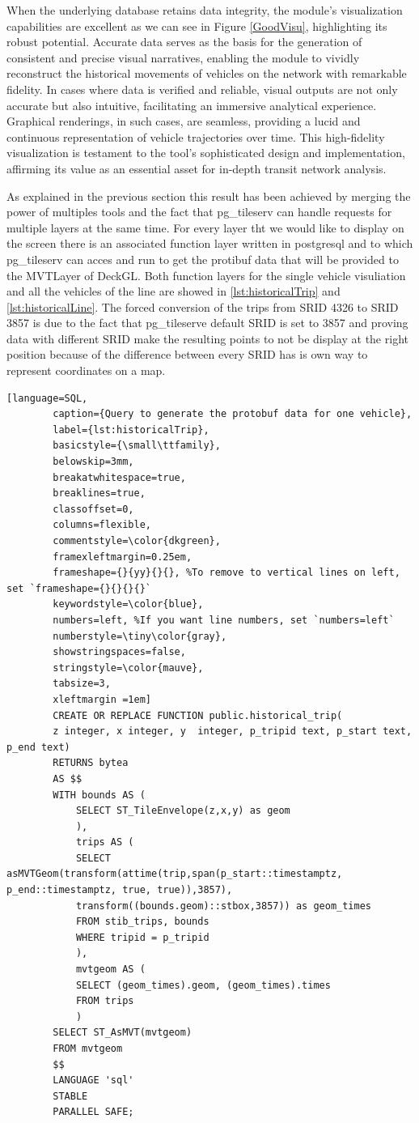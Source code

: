 \documentclass[12pt]{report}
\begin{document}
	When the underlying database retains data integrity, the module's visualization capabilities are excellent as  we can see in Figure \ref{GoodVisu}, highlighting its robust potential. Accurate data serves as the basis for the generation of consistent and precise visual narratives, enabling the module to vividly reconstruct the historical movements of vehicles on the network with remarkable fidelity. In cases where data is verified and reliable, visual outputs are not only accurate but also intuitive, facilitating an immersive analytical experience. Graphical renderings, in such cases, are seamless, providing a lucid and continuous representation of vehicle trajectories over time. This high-fidelity visualization is testament to the tool's sophisticated design and implementation, affirming its value as an essential asset for in-depth transit network analysis.
	
	As explained in the  previous section this result has been achieved by merging the power of multiples tools and the fact that pg\_tileserv can  handle requests for  multiple layers at the same time. For every layer tht we would  like to display on the screen there is an associated function layer written in postgresql and to which pg\_tileserv can acces and run to get the protibuf data that will be provided to the MVTLayer of DeckGL. Both function layers for the single vehicle visuliation and all the vehicles of the line are showed in \ref{lst:historicalTrip} and \ref{lst:historicalLine}. The forced conversion of the trips from SRID 4326 to SRID 3857 is due to the fact that pg\_tileserve default SRID is set to 3857 and proving data with different SRID make the resulting points to not be display at the right position because of the difference between every SRID has is own way to represent coordinates on a map. 
	

	\begin{lstlisting}[language=SQL,
		caption={Query to generate the protobuf data for one vehicle},
		label={lst:historicalTrip},
		basicstyle={\small\ttfamily},
		belowskip=3mm,
		breakatwhitespace=true,
		breaklines=true,
		classoffset=0,
		columns=flexible,
		commentstyle=\color{dkgreen},
		framexleftmargin=0.25em,
		frameshape={}{yy}{}{}, %To remove to vertical lines on left, set `frameshape={}{}{}{}`
		keywordstyle=\color{blue},
		numbers=left, %If you want line numbers, set `numbers=left`
		numberstyle=\tiny\color{gray},
		showstringspaces=false,
		stringstyle=\color{mauve},
		tabsize=3,
		xleftmargin =1em]
		CREATE OR REPLACE FUNCTION public.historical_trip(
		z integer, x integer, y  integer, p_tripid text, p_start text, p_end text)
		RETURNS bytea
		AS $$
		WITH bounds AS (
			SELECT ST_TileEnvelope(z,x,y) as geom
			),
			trips AS (
			SELECT asMVTGeom(transform(attime(trip,span(p_start::timestamptz, p_end::timestamptz, true, true)),3857),
			transform((bounds.geom)::stbox,3857)) as geom_times
			FROM stib_trips, bounds
			WHERE tripid = p_tripid
			),
			mvtgeom AS (
			SELECT (geom_times).geom, (geom_times).times
			FROM trips
			)
		SELECT ST_AsMVT(mvtgeom) 
		FROM mvtgeom
		$$
		LANGUAGE 'sql'
		STABLE
		PARALLEL SAFE;
	\end{lstlisting}
	
\end{document}
